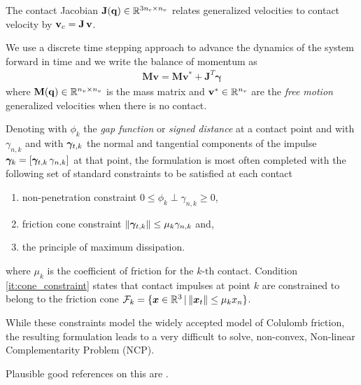 The contact Jacobian ${\mathbf{J}}({\mathbf{q}})\in\mathbb{R}^{3n_c\times n_v}$ relates
generalized velocities to contact velocity by ${\mathbf{v}}_c={\mathbf{J}}\,{\mathbf{v}}$.

We use a discrete time stepping approach to advance the dynamics of the system
forward in time and we write the balance of momentum as
\begin{eqnarray}
	\mathbf{M}\mathbf{v} = \mathbf{M}\mathbf{v}^* + \mathbf{J}^T\mathbf{\gamma}
	\label{eq:momentum_balance}
\end{eqnarray}
where ${\mathbf{M}}({\mathbf{q}})\in\mathbb{R}^{n_v\times n_v}$ is the mass matrix and
${\mathbf{v}}^*\in\mathbb{R}^{n_v}$ are the \textit{free motion} generalized
velocities when there is no contact.

Denoting with $\phi_k$ the \textit{gap function} or \textit{signed distance} at
a contact point and with $\gamma_{n,k}$ and with ${\bm\gamma}_{t,k}$ the normal and
tangential components of the impulse ${\bm\gamma}_k=[{\bm\gamma}_{t,k}\,\gamma_{n,k}]$
at that point, the formulation is most often completed with the following set of
standard constraints to be satisfied at each contact
\begin{enumerate}
	\item non-penetration constraint $0\le\phi_k\perp\gamma_{n,k}\ge0$,
	\item\label{it:cone_constraint} friction cone constraint
	$\Vert{\bm\gamma}_{t,k}\Vert\le \mu_k\gamma_{n,k}$ and,
	\item the principle of maximum dissipation.
\end{enumerate}
where $\mu_k$ is the coefficient of friction for the $k\text{-th}$ contact.
Condition \ref{it:cone_constraint} states that contact impulses at point $k$ are
constrained to belong to the friction cone
$\mathcal{F}_k=\{{\bm{x}}\in\mathbb{R}^3 \,|\, \Vert{\bm{x}}_t\Vert\le \mu_k x_n\}$.

While these constraints model the widely accepted model of Colulomb friction,
the resulting formulation leads to a very difficult to solve, non-convex,
Non-linear Complementarity Problem (NCP). 



Plausible good references on this are
\cite{bib:stewart1996implicit,bib:stewart2000implicit,bib:chakraborty2007implicit,bib:acary2018solving,bib:pang1999unified,bib:alart2018inconsistency}.

